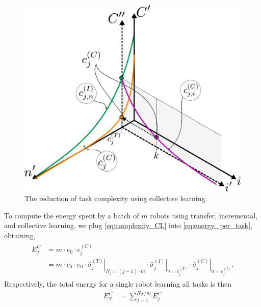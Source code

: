 \begin{figure}[!t]
	\centering
	\includegraphics[width=0.99\columnwidth]{fig/concept_CL.pdf}
	\caption{The reduction of task complexity using collective learning.}
	\label{fig:complexity_CL}
\end{figure}
To compute the energy spent by a batch of $m$ robots using transfer, incremental, and collective learning, we plug \eqref{eq:complexity_CL} into \eqref{eq:energy_per_task}, obtaining,
\begin{align}\label{eq:cl_energy_per_task}
\begin{split}
    E^{C}_j &= m \cdot e_0 \cdot c^{(C)}_j\\
    &= m \cdot c_0 \cdot e_0 \cdot \left.\bar{\sigma}^{(T)}_j \right\vert_{N_j = (j-1)\cdot m} \cdot \left.{\bar{\sigma}^{(I)}_j}\right\vert_{n = c^{(T)}_j} \cdot \left.\bar{\sigma}^{(C)}_j\right\vert_{n=c^{(I)}_j}.
\end{split}    
\end{align}
Respectively, the total energy for a single robot learning all tasks is then
\begin{align}\label{eq:cl_total_energy}
  E^{C}_{\mathcal{T}} &= \sum^{{N_{\mathcal{T}}}/{m}}_{j=1} E^{C}_j
\end{align}

